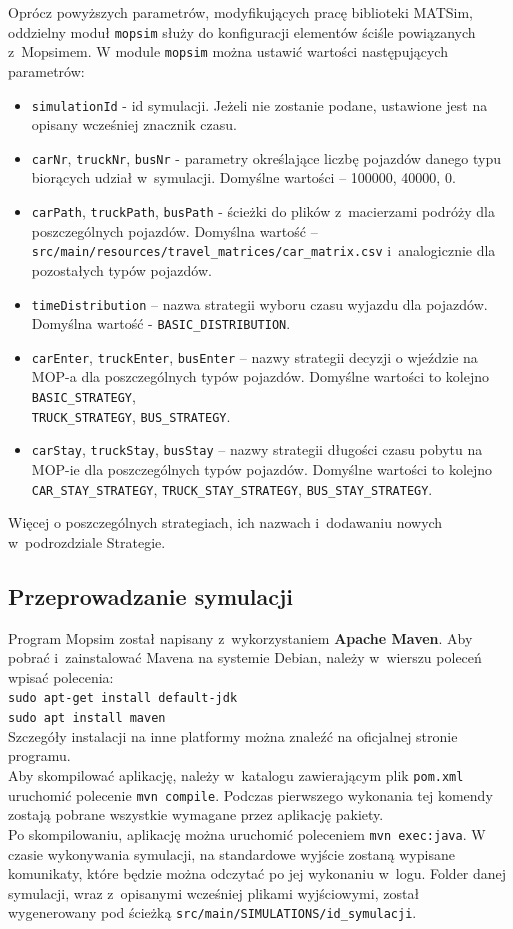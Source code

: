 Oprócz powyższych parametrów, modyfikujących pracę biblioteki MATSim, oddzielny moduł \texttt{mopsim} służy do konfiguracji elementów ściśle powiązanych z~Mopsimem. W module \texttt{mopsim} można ustawić wartości następujących parametrów:
\begin{itemize}
\item \texttt{simulationId} - id symulacji. Jeżeli nie zostanie podane, ustawione jest na opisany wcześniej znacznik czasu.
\item \texttt{carNr}, \texttt{truckNr}, \texttt{busNr} - parametry określające liczbę pojazdów danego typu biorących udział w~symulacji. Domyślne wartości -- 100000, 40000, 0.
\item \texttt{carPath}, \texttt{truckPath}, \texttt{busPath} - ścieżki do plików z~macierzami podróży dla poszczególnych pojazdów. Domyślna wartość -- \\\texttt{src/main/resources/travel\_matrices/car\_matrix.csv} i~analogicznie dla pozostałych typów pojazdów.
\item \texttt{timeDistribution} -- nazwa strategii wyboru czasu wyjazdu dla pojazdów. Domyślna wartość - \texttt{BASIC\_DISTRIBUTION}.
\item \texttt{carEnter}, \texttt{truckEnter}, \texttt{busEnter} -- nazwy strategii decyzji o wjeździe na MOP-a dla poszczególnych typów pojazdów. Domyślne wartości to kolejno \texttt{BASIC\_STRATEGY}, \\\texttt{TRUCK\_STRATEGY}, \texttt{BUS\_STRATEGY}.
\item \texttt{carStay}, \texttt{truckStay}, \texttt{busStay} -- nazwy strategii długości czasu pobytu na MOP-ie dla poszczególnych typów pojazdów. Domyślne wartości to kolejno \texttt{CAR\_STAY\_STRATEGY}, \texttt{TRUCK\_STAY\_STRATEGY}, \texttt{BUS\_STAY\_STRATEGY}.
\end{itemize}
Więcej o poszczególnych strategiach, ich nazwach i~dodawaniu nowych w~podrozdziale Strategie.
\subsection{Przeprowadzanie symulacji}
Program Mopsim został napisany z~wykorzystaniem \textbf{Apache Maven}. Aby pobrać i~zainstalować Mavena na systemie Debian, należy w~wierszu poleceń wpisać polecenia:\\
\texttt{sudo apt-get install default-jdk}\\
\texttt{sudo apt install maven}\\
Szczegóły instalacji na inne platformy można znaleźć na oficjalnej stronie programu.\\
Aby skompilować aplikację, należy w~katalogu zawierającym plik \texttt{pom.xml} uruchomić polecenie \texttt{mvn compile}. Podczas pierwszego wykonania tej komendy zostają pobrane wszystkie wymagane przez aplikację pakiety.\\
Po skompilowaniu, aplikację można uruchomić poleceniem \texttt{mvn exec:java}. W czasie wykonywania symulacji, na standardowe wyjście zostaną wypisane komunikaty, które będzie można odczytać po jej wykonaniu w~logu. Folder danej symulacji, wraz z~opisanymi wcześniej plikami wyjściowymi, został wygenerowany pod ścieżką \texttt{src/main/SIMULATIONS/id\_symulacji}.
